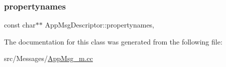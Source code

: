 \subsubsection{\texorpdfstring{propertynames}{propertynames}}
{\footnotesize\ttfamily const char$\ast$$\ast$ App\+Msg\+Descriptor\+::propertynames\hspace{0.3cm}{\ttfamily [mutable]}, {\ttfamily [private]}}



The documentation for this class was generated from the following file\+:\begin{DoxyCompactItemize}
\item 
src/\+Messages/\hyperlink{_app_msg__m_8cc}{App\+Msg\+\_\+m.\+cc}\end{DoxyCompactItemize}
